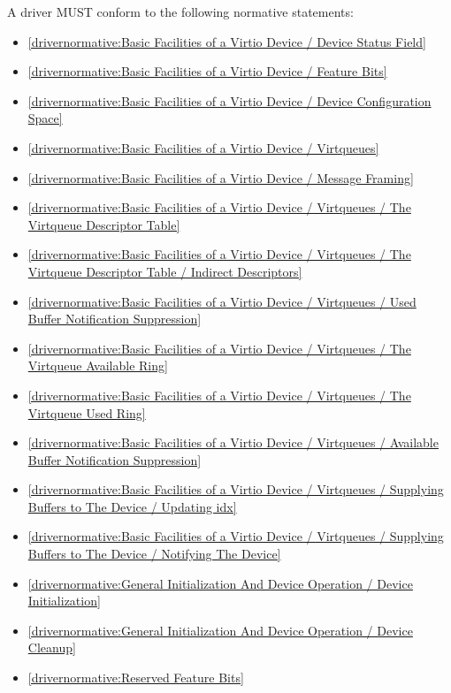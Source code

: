 \label{sec:Conformance / Driver Conformance}

A driver MUST conform to the following normative statements:

\begin{itemize}
\item \ref{drivernormative:Basic Facilities of a Virtio Device / Device Status Field}
\item \ref{drivernormative:Basic Facilities of a Virtio Device / Feature Bits}
\item \ref{drivernormative:Basic Facilities of a Virtio Device / Device Configuration Space}
\item \ref{drivernormative:Basic Facilities of a Virtio Device / Virtqueues}
\item \ref{drivernormative:Basic Facilities of a Virtio Device / Message Framing}
\item \ref{drivernormative:Basic Facilities of a Virtio Device / Virtqueues / The Virtqueue Descriptor Table}
\item \ref{drivernormative:Basic Facilities of a Virtio Device / Virtqueues / The Virtqueue Descriptor Table / Indirect Descriptors}
\item \ref{drivernormative:Basic Facilities of a Virtio Device / Virtqueues / Used Buffer Notification Suppression}
\item \ref{drivernormative:Basic Facilities of a Virtio Device / Virtqueues / The Virtqueue Available Ring}
\item \ref{drivernormative:Basic Facilities of a Virtio Device / Virtqueues / The Virtqueue Used Ring}
\item \ref{drivernormative:Basic Facilities of a Virtio Device / Virtqueues / Available Buffer Notification Suppression}
\item \ref{drivernormative:Basic Facilities of a Virtio Device / Virtqueues / Supplying Buffers to The Device / Updating idx}
\item \ref{drivernormative:Basic Facilities of a Virtio Device / Virtqueues / Supplying Buffers to The Device / Notifying The Device}
\item \ref{drivernormative:General Initialization And Device Operation / Device Initialization}
\item \ref{drivernormative:General Initialization And Device Operation / Device Cleanup}
\item \ref{drivernormative:Reserved Feature Bits}
\end{itemize}

